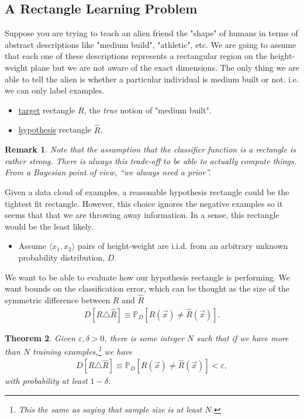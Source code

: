 \documentclass[12pt, letterpaper]{article}
\numberwithin{equation}{section} %
\newcommand{\ul}{\underline}
\newcommand{\mb}{\mathbb}
\newcommand{\ve}{\varepsilon}
\newtheorem{theorem}{Theorem}[section]
\newtheorem{remark}[theorem]{Remark}
\theoremstyle{definition}
\theoremstyle{remark}
\begin{document}
\subsection{A Rectangle Learning Problem}

Suppose you are trying to teach an alien friend the "shape" of humans in terms of abstract descriptions like "medium build", "athletic", etc. 
We are going to assume that each one of these descriptions represents a rectangular region on the height-weight plane but we are not aware of the exact dimensions. 
The only thing we are able to tell the alien is whether a particular individual is medium built or not. i.e. we can only label examples.

\begin{itemize}
	\item \ul{target} rectangle $R$, the \emph{true} notion of "medium built".
	\item \ul{hypothesis} rectangle $\hat R$. 
\end{itemize}

\begin{remark}
	Note that the assumption that the classifier function is a rectangle is rather strong. 
	There is always this trade-off to be able to actually compute things. 
	From a Bayesian point of view, ``we always need a prior''.
\end{remark}

Given a data cloud of examples, a reasonable hypothesis rectangle could be the tightest fit rectangle. 
However, this choice ignores the negative examples so it seems that that we are throwing away information. 
In a sense, this rectangle would be the least likely.

\begin{itemize}
	\item Assume $\langle x_1,x_2 \rangle$ pairs of height-weight are i.i.d. from an arbitrary unknown probability distribution, $D$.
\end{itemize}

We want to be able to evaluate how our hypothesis rectangle is performing. 
We want bounds on the classification error, which can be thought as the size of the symmetric difference between $R$ and $\hat R$
\begin{align}
	D[R\triangle \hat R] \equiv \mb P_D[R(\vec x) \ne \hat R(\vec x)].
\end{align}

\begin{theorem}
	Given $\ve,\delta >0$, there is some integer $N$ such that if we have more than $N$ training examples,\footnote{This the same as saying that sample size is at least $N$.} we have
	\begin{align}
		D[R\triangle \hat R] \equiv \mb P_D[R(\vec x) \ne \hat R(\vec x)] < \ve,
	\end{align}
	with probability at least $1-\delta$.
\end{theorem}
\end{document}
